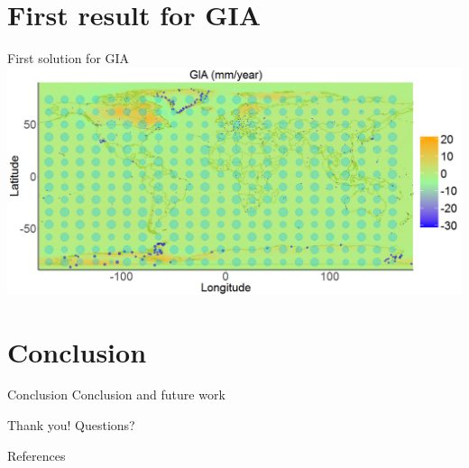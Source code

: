 \documentclass{beamer}
\begin{document}
\section{First result for GIA}
\begin{frame}{First solution for GIA}
\includegraphics[width = \textwidth]{images/GIA_map}
\end{frame}

\section{Conclusion}
\begin{frame}{Conclusion}
Conclusion and future work

\end{frame}


\begin{frame}[plain]
Thank you!
Questions?
\end{frame}


\begin{frame}[plain]{References}

\small{}
\end{frame}
\end{document}
